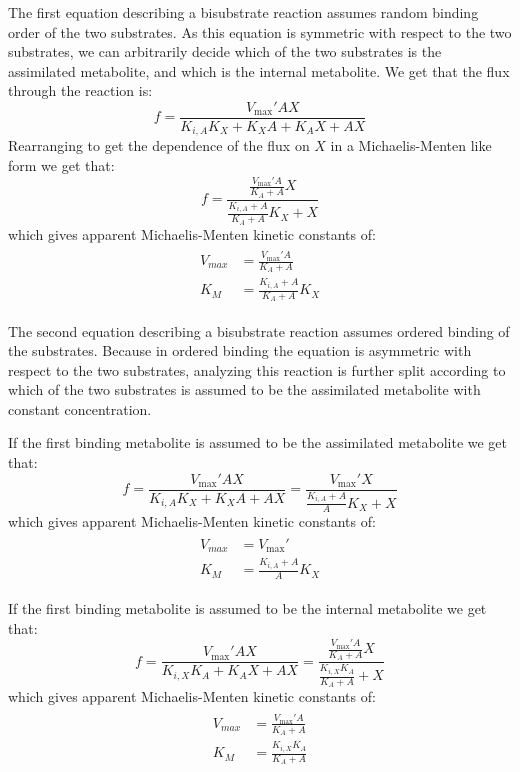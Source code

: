   The first equation describing a bisubstrate reaction assumes random binding order of the two substrates.
  As this equation is symmetric with respect to the two substrates, we can arbitrarily decide which of the two substrates is the assimilated metabolite, and which is the internal metabolite.
  We get that the flux through the reaction is:
  \begin{equation*}
      f=\frac{V_{\max}'AX}{K_{i,A}K_X+K_XA+K_AX+AX}
  \end{equation*}
  Rearranging to get the dependence of the flux on $X$ in a Michaelis-Menten like form we get that:
  \begin{equation}
      \label{eq:birandmm}
      f=\frac{\frac{V_{\max}'A}{K_A+A}X}{\frac{K_{i,A}+A}{K_A+A}K_X+X}
  \end{equation}
  which gives apparent Michaelis-Menten kinetic constants of:
  \begin{align}
  \begin{split}
      \label{eq:paramssym}
      V_{max}&=\frac{V_{\max}'A}{K_A+A} \\
      K_M&=\frac{K_{i,A}+A}{K_A+A}K_X
  \end{split}
  \end{align}

  The second equation describing a bisubstrate reaction assumes ordered binding of the substrates.
  Because in ordered binding the equation is asymmetric with respect to the two substrates, analyzing this reaction is further split according to which of the two substrates is assumed to be the assimilated metabolite with constant concentration.

  If the first binding metabolite is assumed to be the assimilated metabolite we get that:
  \begin{equation}
      \label{eq:biordfstmm}
      f=\frac{V_{\max}'AX}{K_{i,A}K_X+K_XA+AX}=\frac{V_{\max}'X}{\frac{K_{i,A}+A}{A}K_X+X}
  \end{equation}
  which gives apparent Michaelis-Menten kinetic constants of:
  \begin{align}
  \begin{split}
      \label{eq:paramsasymfst}
      V_{max}&=V_{\max}' \\
      K_M&=\frac{K_{i,A}+A}{A}K_X
  \end{split}
  \end{align}
  
  If the first binding metabolite is assumed to be the internal metabolite we get that:
  \begin{equation}
      \label{eq:biordsndmm}
      f=\frac{V_{\max}'AX}{K_{i,X}K_A+K_AX+AX}=\frac{\frac{V_{\max}'A}{K_A+A}X}{\frac{K_{i,X}K_A}{K_A+A}+X}
  \end{equation}
  which gives apparent Michaelis-Menten kinetic constants of:
  \begin{align}
  \begin{split}
      \label{eq:paramsasymsnd}
      V_{max}&=\frac{V_{\max}'A}{K_A+A} \\
      K_M&=\frac{K_{i,X}K_A}{K_A+A}
  \end{split}
  \end{align}


